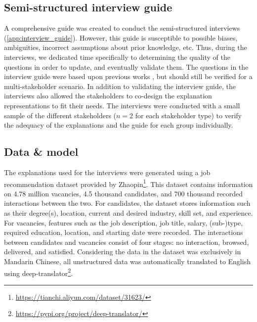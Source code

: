 \subsection{Semi-structured interview guide}
A comprehensive guide was created to conduct the semi-structured interviews (\cref{app:interview_guide}). However, this guide is susceptible to possible biases, ambiguities, incorrect assumptions about prior knowledge, etc. Thus, during the interviews, we dedicated time specifically to determining the quality of the questions in order to update, and eventually validate them. The questions in the interview guide were based upon previous works \cite{chen2005trust,cramer2008effects,kleinerman2018providing,pu2011user}, but should still be verified for a multi-stakeholder scenario. In addition to validating the interview guide, the interviews also allowed the stakeholders to co-design the explanation representations to fit their needs. The interviews were conducted with a small sample of the different stakeholders ($n = 2$ for each stakeholder type) to verify the adequacy of the explanations and the guide for each group individually.  


\subsection{Data \& model}
The explanations used for the interviews were generated using a job recommendation dataset provided by Zhaopin\footnote{\url{https://tianchi.aliyun.com/dataset/31623/}}. This dataset contains information on 4.78 million vacancies, 4.5 thousand candidates, and 700 thousand recorded interactions between the two. For candidates, the dataset stores information such as their degree(s), location, current and desired industry, skill set, and experience. For vacancies, features such as the job description, job title, salary, (sub-)type, required education, location, and starting date were recorded. The interactions between candidates and vacancies consist of four stages: no interaction, browsed, delivered, and satisfied. Considering the data in the dataset was exclusively in Mandarin Chinese, all unstructured data was automatically translated to English using deep-translator\footnote{\url{https://pypi.org/project/deep-translator/}}.

